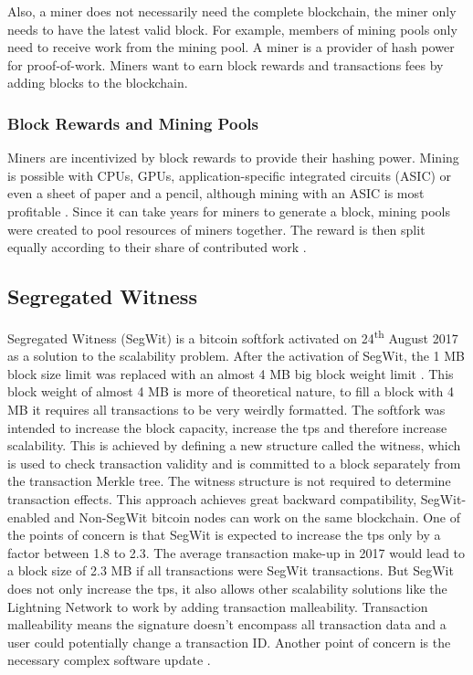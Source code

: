 Also, a miner does not necessarily need the complete blockchain, the miner only needs to have the latest valid block. For example, members of mining pools only need to receive work from the mining pool. A miner is a provider of hash power for proof-of-work. Miners want to earn block rewards and transactions fees by adding blocks to the blockchain.

\subsubsection{Block Rewards and Mining Pools}
Miners are incentivized by block rewards to provide their hashing power. Mining is possible with CPUs, GPUs, application-specific integrated circuits (ASIC) or even a sheet of paper and a pencil, although mining with an ASIC is most profitable \cite{ASIC}. Since it can take years for miners to generate a block, mining pools were created to pool resources of miners together. The reward is then split equally according to their share of contributed work \cite{miningPool}.

\subsection{Segregated Witness}
Segregated Witness (SegWit) is a bitcoin softfork activated on 24\textsuperscript{th} August 2017 as a solution to the scalability problem. After the activation of SegWit, the 1 MB block size limit was replaced with an almost 4 MB big block weight limit \cite{segWit}. This block weight of almost 4 MB is more of theoretical nature, to fill a block with 4 MB it requires all transactions to be very weirdly formatted. The softfork was intended to increase the block capacity, increase the tps and therefore increase scalability. This is achieved by defining a new structure called the witness, which is used to check transaction validity and is committed to a block separately from the transaction Merkle tree. The witness structure is not required to determine transaction effects. This approach achieves great backward compatibility, SegWit-enabled and Non-SegWit bitcoin nodes can work on the same blockchain. One of the points of concern is that SegWit is expected to increase the tps only by a factor between 1.8 to 2.3. The average transaction make-up in 2017 would lead to a block size of 2.3 MB if all transactions were SegWit transactions. But SegWit does not only increase the tps, it also allows other scalability solutions like the Lightning Network to work by adding transaction malleability. Transaction malleability means the signature doesn’t encompass all transaction data and a user could potentially change a transaction ID. Another point of concern is the necessary complex software update \cite{seminarPaper}.

